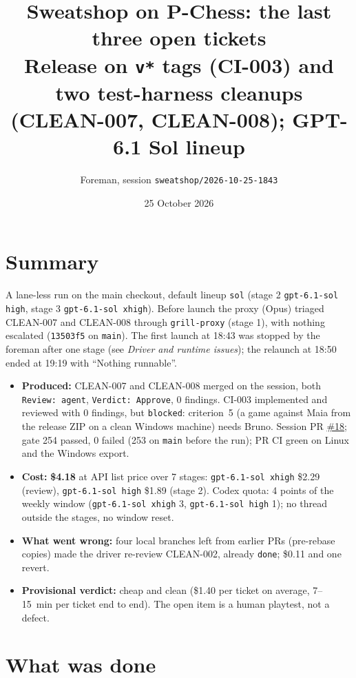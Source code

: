 \documentclass[11pt,a4paper]{article}
\title{Sweatshop on P-Chess: the last three open tickets\\\large Release on \texttt{v*} tags (CI-003) and two test-harness cleanups (CLEAN-007, CLEAN-008); GPT-6.1 Sol lineup}
\author{Foreman, session \texttt{sweatshop/2026-10-25-1843}}
\date{25 October 2026}
\begin{document}
\maketitle

\section*{Summary}

A lane-less run on the main checkout, default lineup \texttt{sol} (stage 2
\texttt{gpt-6.1-sol high}, stage 3 \texttt{gpt-6.1-sol xhigh}). Before launch the proxy (Opus)
triaged CLEAN-007 and CLEAN-008 through \texttt{grill-proxy} (stage 1), with nothing escalated
(\texttt{13503f5} on \texttt{main}). The first launch at 18:43 was stopped by the foreman after
one stage (see \emph{Driver and runtime issues}); the relaunch at 18:50 ended at 19:19 with
``Nothing runnable''.

\begin{itemize}
  \item \textbf{Produced:} CLEAN-007 and CLEAN-008 merged on the session, both
        \texttt{Review: agent}, \texttt{Verdict: Approve}, 0 findings. CI-003 implemented and
        reviewed with 0 findings, but \texttt{blocked}: criterion~5 (a game against Maia from the
        release ZIP on a clean Windows machine) needs Bruno. Session PR
        \href{https://github.com/Laginho/P-Chess/pull/18}{\#18}; gate 254 passed, 0 failed
        (253 on \texttt{main} before the run); PR CI green on Linux and the Windows export.
  \item \textbf{Cost:} \textbf{\$4.18} at API list price over 7 stages:
        \texttt{gpt-6.1-sol xhigh} \$2.29 (review), \texttt{gpt-6.1-sol high} \$1.89 (stage 2).
        Codex quota: 4 points of the weekly window (\texttt{gpt-6.1-sol xhigh} 3,
        \texttt{gpt-6.1-sol high} 1); no thread outside the stages, no window reset.
  \item \textbf{What went wrong:} four local branches left from earlier PRs (pre-rebase copies)
        made the driver re-review CLEAN-002, already \texttt{done}; \$0.11 and one revert.
  \item \textbf{Provisional verdict:} cheap and clean (\$1.40 per ticket on average, 7--15~min
        per ticket end to end). The open item is a human playtest, not a defect.
\end{itemize}

\section*{What was done}
\end{document}
